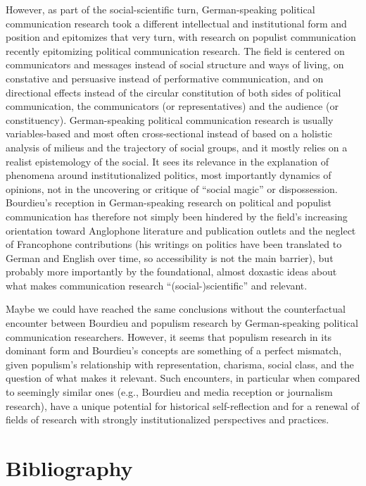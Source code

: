 \documentclass{tufte-handout}
\begin{document}
However, as part of the social-scientific turn, German-speaking
political communication research took a different intellectual and
institutional form and position and epitomizes that very turn, with
research on populist communication recently epitomizing political
communication research. The field is centered on communicators and
messages instead of social structure and ways of living, on constative
and persuasive instead of performative communication, and on directional
effects instead of the circular constitution of both sides of political
communication, the communicators (or representatives) and the audience
(or constituency). German-speaking political communication research is
usually variables-based and most often cross-sectional instead of based
on a holistic analysis of milieus and the trajectory of social groups,
and it mostly relies on a realist epistemology of the social. It sees
its relevance in the explanation of phenomena around institutionalized
politics, most importantly dynamics of opinions, not in the uncovering
or critique of ``social magic'' or dispossession. Bourdieu's reception
in German-speaking research on political and populist communication has
therefore not simply been hindered by the field's increasing orientation
toward Anglophone literature and publication outlets and the neglect of
Francophone contributions (his writings on politics have been translated
to German and English over time, so accessibility is not the main
barrier), but probably more importantly by the foundational, almost
doxastic ideas about what makes communication research
``(social-)scientific'' and relevant.

Maybe we could have reached the same conclusions without the
counterfactual encounter between Bourdieu and populism research by
German-speaking political communication researchers. However, it seems
that populism research in its dominant form and Bourdieu's concepts are
something of a perfect mismatch, given populism's relationship with
representation, charisma, social class, and the question of what makes
it relevant. Such encounters, in particular when compared to seemingly
similar ones (e.g., Bourdieu and media reception or journalism
research), have a unique potential for historical self-reflection and
for a renewal of fields of research with strongly institutionalized
perspectives and practices.




\newpage\section{Bibliography}\label{bibliography}
\end{document}
